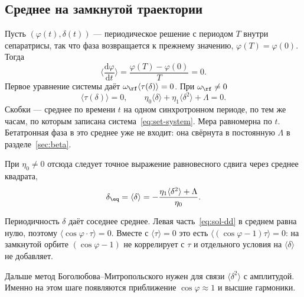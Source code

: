 \subsection{Среднее на замкнутой траектории}
\label{sec:sol-mean}

Пусть $(\varphi(t),\delta(t))$ --- периодическое решение с периодом $T$ внутри сепаратрисы, так что фаза возвращается к прежнему значению, $\varphi(T)=\varphi(0)$. Тогда
\begin{equation}
\label{eq:sol-dphi-avg}
\Biggl\langle\frac{\mathrm{d}\varphi}{\mathrm{d}t}\Biggr\rangle
=\frac{\varphi(T)-\varphi(0)}{T}=0.
\end{equation}
Первое уравнение системы даёт $\omega_\rf\langle\tau(\delta)\rangle=0$. При $\omega_\rf\neq 0$
\begin{equation}
\label{eq:sol-mean}
\langle\tau(\delta)\rangle=0,
\qquad
\eta_0\langle\delta\rangle+\eta_1\langle\delta^2\rangle+\Lambda=0.
\end{equation}
Скобки --- среднее по времени $t$ на одном синхротронном периоде, по тем же часам, по которым записана система~\eqref{eq:set-system}. Мера равномерна по $t$. Бетатронная фаза в это среднее уже не входит: она свёрнута в постоянную $\Lambda$ в разделе~\ref{sec:beta}.

При $\eta_0\neq 0$ отсюда следует точное выражение равновесного сдвига через среднее квадрата,
\begin{equation}
\label{eq:sol-deq-exact}
\delta_\eq
=\langle\delta\rangle
=-\frac{\eta_1\langle\delta^2\rangle+\Lambda}{\eta_0}.
\end{equation}


Периодичность $\delta$ даёт соседнее среднее. Левая часть~\eqref{eq:sol-dd} в среднем равна нулю, поэтому $\langle\cos\varphi\cdot\tau\rangle=0$. Вместе с $\langle\tau\rangle=0$ это есть $\langle(\cos\varphi-1)\tau\rangle=0$: на замкнутой орбите $(\cos\varphi-1)$ не коррелирует с $\tau$ и отдельного условия на $\langle\delta\rangle$ не добавляет.

Дальше метод Боголюбова--Митропольского нужен для связи $\langle\delta^2\rangle$ с амплитудой. Именно на этом шаге появляются приближение $\cos\varphi\approx 1$ и высшие гармоники.

